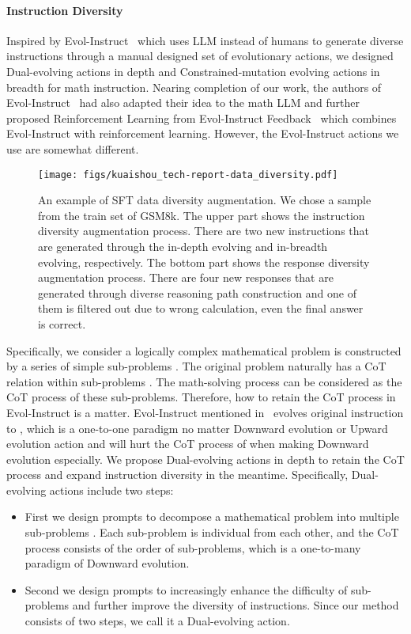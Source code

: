 \documentclass{article}
\begin{document}
\paragraph{Instruction Diversity} Inspired by Evol-Instruct~\cite{xu2023wizardlm, luo2023wizardcoder} which uses LLM instead of humans to generate diverse instructions through a manual designed set of evolutionary actions, we designed Dual-evolving actions in depth and Constrained-mutation evolving actions in breadth for math instruction.
Nearing completion of our work, the authors of Evol-Instruct~\cite{xu2023wizardlm, luo2023wizardcoder} had also adapted their idea to the math LLM and further proposed Reinforcement Learning from Evol-Instruct Feedback~\cite{luo2023wizardmath} which combines Evol-Instruct with reinforcement learning.
However, the Evol-Instruct actions we use are somewhat different. 
\begin{figure*}[!t]
    \centering
    \texttt{[image: figs/kuaishou\_tech-report-data\_diversity.pdf]}
\caption{An example of SFT data diversity augmentation. We chose a sample from the train set of GSM8k. The upper part shows the instruction diversity augmentation process. There are two new instructions that are generated through the in-depth evolving and in-breadth evolving, respectively. The bottom part shows the response diversity augmentation process. There are four new responses that are generated through diverse reasoning path construction and one of them is filtered out due to wrong calculation, even the final answer is correct.}
    \label{fig:fig1}
\end{figure*}
Specifically, we consider a logically complex mathematical problem  is constructed by a series of simple sub-problems . 
The original problem  naturally has a CoT relation within sub-problems . 
The math-solving process can be considered as the CoT process of these sub-problems. 
Therefore, how to retain the CoT process in Evol-Instruct is a matter. 
Evol-Instruct mentioned in~\citet{luo2023wizardmath} evolves original instruction  to , which is a one-to-one paradigm no matter Downward evolution or Upward evolution action and will hurt the CoT process of  when making Downward evolution especially. 
We propose Dual-evolving actions in depth to retain the CoT process and expand instruction diversity in the meantime. 
Specifically, Dual-evolving actions include two steps:
\begin{itemize}
    \item First we design prompts to decompose a mathematical problem  into multiple sub-problems . Each sub-problem is individual from each other, and the CoT process consists of the order of sub-problems, which is a one-to-many paradigm of Downward evolution.
    \item Second we design prompts to increasingly enhance the difficulty of sub-problems and further improve the diversity of instructions. Since our method consists of two steps, we call it a Dual-evolving action.
\end{itemize}
\end{document}
